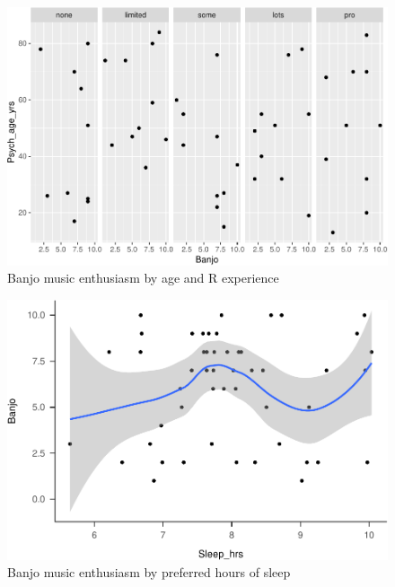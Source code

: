 \documentclass[english,man]{apa6}
\theoremstyle{definition}
\theoremstyle{definition}
\theoremstyle{definition}
\theoremstyle{remark}
\begin{document}
\begin{figure}
\centering
\includegraphics{gilmore-hallquist-bootcamp-2018-papaja_files/figure-latex/Banjo-by-age-exp-1.pdf}
\caption{\label{fig:Banjo-by-age-exp}Banjo music enthusiasm by age and R
experience}
\end{figure}

\begin{figure}
\centering
\includegraphics{gilmore-hallquist-bootcamp-2018-papaja_files/figure-latex/Banjo-by-sleep-1.pdf}
\caption{\label{fig:Banjo-by-sleep}Banjo music enthusiasm by preferred hours
of sleep}
\end{figure}
\end{document}
